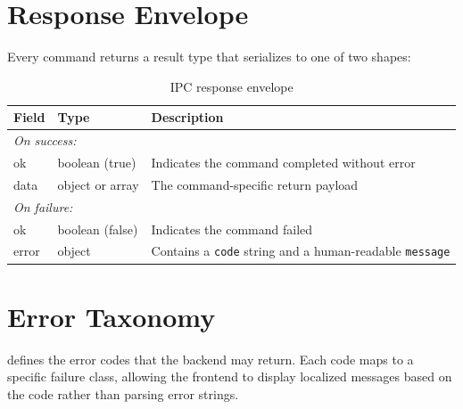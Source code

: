\documentclass[a4paper, 11pt, oneside]{report}
\begin{document}
\section{Response Envelope}
\label{sec:response-envelope}

Every command returns a result type that serializes to one of two shapes:

\begin{table}[H]
  \centering
  \caption{IPC response envelope}
  \label{tab:response}
  \begin{tabularx}{\textwidth}{l l X}
    \toprule
    \textbf{Field} & \textbf{Type} & \textbf{Description} \\
    \midrule
    \multicolumn{3}{l}{\textit{On success:}} \\
    ok    & boolean (true)  & Indicates the command completed without error \\
    data  & object or array & The command-specific return payload \\
    \midrule
    \multicolumn{3}{l}{\textit{On failure:}} \\
    ok    & boolean (false) & Indicates the command failed \\
    error & object          & Contains a \texttt{code} string and a human-readable
                              \texttt{message} \\
    \bottomrule
  \end{tabularx}
\end{table}

\section{Error Taxonomy}
\label{sec:error-taxonomy}

 defines the error codes that the backend may return.
Each code maps to a specific failure class, allowing the frontend to display
localized messages based on the code rather than parsing error strings.
\end{document}
